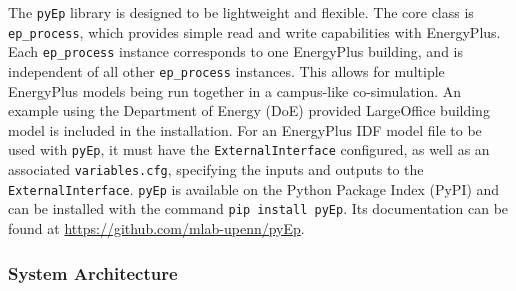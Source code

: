 The \texttt{pyEp} library is designed to be lightweight and flexible. 
The core class is \texttt{ep\_process}, which provides simple read and write capabilities with EnergyPlus. 
Each \texttt{ep\_process} instance corresponds to one EnergyPlus building, and is independent of all other \texttt{ep\_process} instances. 
This allows for multiple EnergyPlus models being run together in a campus-like co-simulation. 
An example using the Department of Energy (DoE) provided LargeOffice building model is included in the installation. 
For an EnergyPlus IDF model file to be used with \texttt{pyEp}, it must have the \texttt{ExternalInterface} configured, as well as an associated \texttt{variables.cfg}, specifying the inputs and outputs to the \texttt{ExternalInterface}.
\texttt{pyEp} is available on the Python Package Index (PyPI) and can be installed with the command \verb|pip install pyEp|.
Its documentation can be found at \url{https://github.com/mlab-upenn/pyEp}.

\subsubsection{System Architecture}


